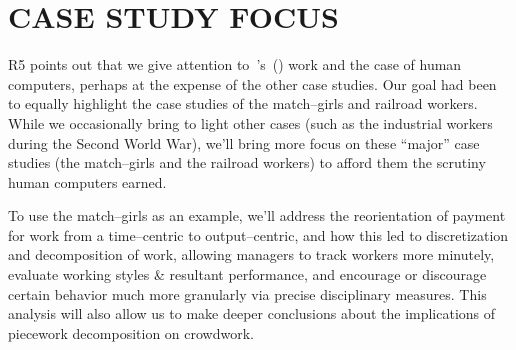 \documentclass[11pt]{article}
\begin{document}

\section*{CASE STUDY FOCUS}
R5 points out that we give attention to~\citeauthor{grier2013computers}'s~(\citeyear{grier2013computers}) work and
the case of human computers,
perhaps at the expense of the other case studies.
Our goal had been to equally highlight the case studies of
the match--girls and railroad workers.
While we occasionally bring to light other cases
(such as the industrial workers during the Second World War),
we'll bring more focus on these ``major'' case studies
(the match--girls and the railroad workers)
to afford them
the scrutiny human computers earned.

To use the match--girls as an example, we'll address
the reorientation of payment for work from
a time--centric to
output--centric, and how
this led to discretization and decomposition of work,
allowing managers
to track workers more minutely,
evaluate working styles \& resultant performance,
and encourage or discourage certain behavior much more granularly via
precise disciplinary measures.
This analysis will also
allow us to make deeper conclusions about
the implications of piecework decomposition on crowdwork.
\end{document}
